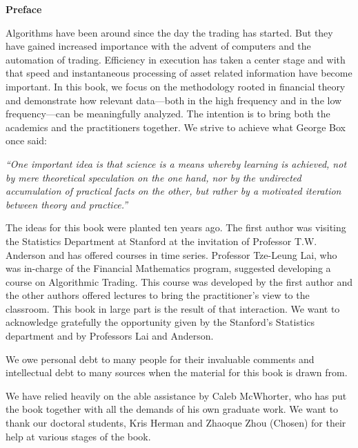 \begin{center} {\large\bfseries Preface} \end{center}


Algorithms have been around since the day the trading has started. But they have gained increased importance with the advent of computers and the automation of trading. Efficiency in execution has taken a center stage and with that speed and instantaneous processing of asset related information have become important. In this book, we focus on the methodology rooted in financial theory and demonstrate how relevant data---both in the high frequency and in the low frequency---can be meaningfully analyzed. The intention is to bring both the academics and the practitioners together. We strive to achieve what George Box once said: \par
        \begin{center}
        \begin{minipage}[t]{0.7\textwidth}
        	\raggedright
          	{\itshape``One important idea is that science is a means whereby learning is achieved, not by mere theoretical speculation on the one hand, nor by the undirected accumulation of practical facts on the other, but rather by a motivated iteration between theory and practice.''}
        \end{minipage} 
        \end{center}


The ideas for this book were planted ten years ago. The first author was visiting the Statistics Department at Stanford at the invitation of Professor T.W. Anderson and has offered courses in time series. Professor Tze-Leung Lai, who was in-charge of the Financial Mathematics program, suggested developing a course on Algorithmic Trading. This course was developed by the first author and the other authors offered lectures to bring the practitioner's view to the classroom. This book in large part is the result of that interaction. We want to acknowledge gratefully the opportunity given by the Stanford's Statistics department and by Professors Lai and Anderson. 


We owe personal debt to many people for their invaluable comments and intellectual debt to many sources when the material for this book is drawn from. 


We have relied heavily on the able assistance by Caleb McWhorter, who has put the book together with all the demands of his own graduate work. We want to thank our doctoral students, Kris Herman and Zhaoque Zhou (Chosen) for their help at various stages of the book. 


